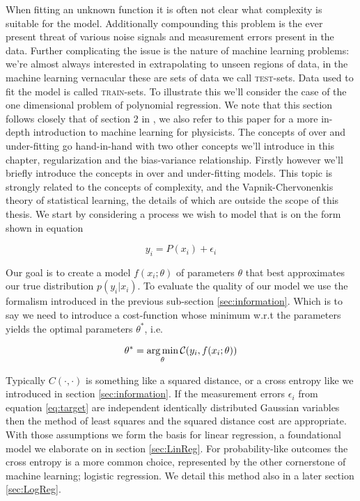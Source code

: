 When fitting an unknown function it is often not clear what complexity is suitable for the model. Additionally compounding this problem is the ever present threat of various noise signals and measurement errors present in the data. Further complicating the issue is the nature of machine learning problems: we're almost always interested in extrapolating to unseen regions of data, in the machine learning vernacular these are sets of data we call \textsc{test}-sets. Data used to fit the model is called  \textsc{train}-sets. To illustrate this we'll consider the case of the one dimensional problem of polynomial regression. We note that this section follows closely that of section 2 in \citet{Mehta2019}, we also refer to this paper for a more in-depth introduction to machine learning for physicists. The concepts of over and under-fitting go hand-in-hand with two other concepts we'll introduce in this chapter, regularization and the bias-variance relationship. Firstly however we'll briefly introduce the concepts in over and under-fitting models. This topic is strongly related to the concepts of complexity, and the Vapnik-Chervonenkis theory of statistical learning, the details of which are outside the scope of this thesis. We start by considering a process we wish to model that is on the form shown in equation \label{eq:target}

\begin{equation}\label{eq:target}
y_i = P(x_i) + \epsilon_i
\end{equation}

\noindent Our goal is to create a model $f(x_i; \theta)$ of parameters $\theta$ that best approximates our true distribution $p(y_i | x_i)$. To evaluate the quality of our model we use the formalism introduced in the previous sub-section \ref{sec:information}. Which is to say we need to introduce a cost-function whose minimum w.r.t the parameters yields the optimal parameters $\theta^*$, i.e. 

\begin{align}
\theta^* = \operatorname*{arg\,min}_\theta \mathcal{C}(y_i, f(x_i; \theta))
\end{align}

\noindent Typically $C(\cdot, \cdot)$ is something like a squared distance, or a cross entropy like we introduced in section \ref{sec:information}. If the measurement errors $\epsilon_i$ from equation \ref{eq:target} are independent identically distributed Gaussian variables then the method of least squares and the squared distance cost are appropriate. With those assumptions we form the basis for linear regression, a foundational model we elaborate on in section \ref{sec:LinReg}. For probability-like outcomes the cross entropy is a more common choice, represented by the other cornerstone of machine learning; logistic regression. We detail this method also in a later section \ref{sec:LogReg}. 

